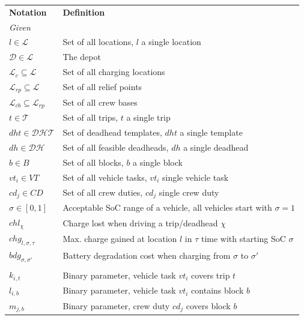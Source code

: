 \documentclass[]{article}
\begin{document}
\begin{table}[h]
  \centering
  \begin{tabular}{ll}
    \toprule
    \multicolumn{1}{l}{\textbf{Notation}} & \multicolumn{1}{l}{\textbf{Definition}}               \\
    \cmidrule(lr){1-1}\cmidrule(lr){2-2}
    \multicolumn{2}{l}{\textit{Given}} \\
    $l \in \mathcal{L}$ & Set of all locations, $l$ a single location \\ 
    $\mathcal{D} \in \mathcal{L}$ & The depot \\ 
    $\mathcal{L}_c \subseteq \mathcal{L}$ & Set of all charging locations \\ 
    $\mathcal{L}_{rp} \subseteq \mathcal{L}$ & Set of all relief points \\ 
    $\mathcal{L}_{cb} \subseteq \mathcal{L}_{rp}$ & Set of all crew bases \\ 
    $t \in \mathcal{T}$ & Set of all trips, $t$ a single trip \\
    $dht \in \mathcal{DHT}$ & Set of deadhead templates, $dht$ a single template \\ 
    $dh \in \mathcal{DH}$ & Set of all feasible deadheads, $dh$ a single deadhead \\ 
    $b \in B$ & Set of all blocks, $b$ a single block \\
    $vt_i \in VT$ & Set of all vehicle tasks, $vt_i$ single vehicle task \\
    $cd_j \in CD$ & Set of all crew duties, $cd_j$ single crew duty \\
    $\sigma \in [0, 1]$ & Acceptable SoC range of a vehicle, all vehicles start with $\sigma=1$\\
    $chl_\chi$ & Charge lost when driving a trip/deadhead $\chi$ \\
    $chg_{l,\sigma,\tau}$ & Max. charge gained at location $l$ in $\tau$ time with starting SoC $\sigma$ \\
    $bdg_{\sigma,\sigma'}$ & Battery degradation cost when charging from $\sigma$ to $\sigma'$ \\
    \addlinespace[0.6em]
    \multicolumn{2}{l}{\textit{Parameters}} \\
    $k_{i,t}$ & Binary parameter, vehicle task $vt_i$ covers trip $t$ \\ 
    $l_{i,b}$ & Binary parameter, vehicle task $vt_i$ contains block $b$ \\ 
    $m_{j,b}$ & Binary parameter, crew duty $cd_j$ covers block $b$ \\ 

\end{tabular}
\end{table}
\end{document}
